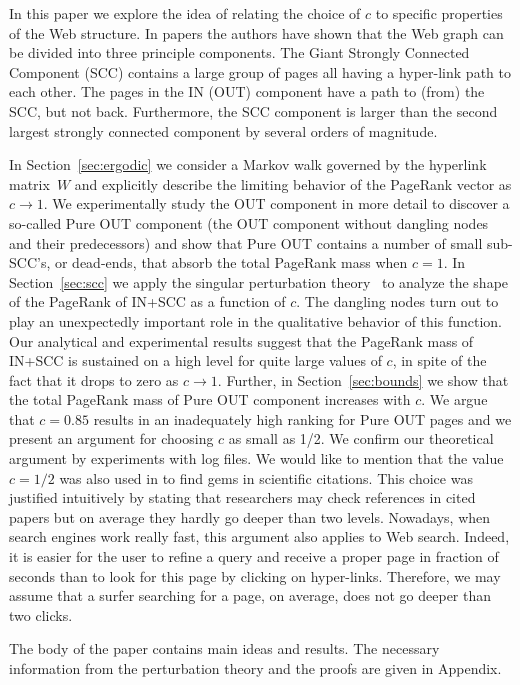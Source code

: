 \documentclass{article}
\begin{document}
In this paper we explore the idea of relating the choice of $c$ to
specific properties of the Web structure. In papers
\cite{Broder00,Kumar00} the authors have shown that the Web graph
can be divided into three principle components. The Giant Strongly
Connected Component (SCC) contains a large group of pages all having
a hyper-link path to each other. The pages in the IN (OUT) component
have a path to (from) the SCC, but not back. Furthermore, the SCC
component is larger than the second largest strongly connected
component by several orders of magnitude.

In
Section~\ref{sec:ergodic} we consider a Markov walk governed by the
hyperlink matrix~$W$ and explicitly describe the limiting behavior
of the PageRank vector as $c\to 1$. We experimentally study the
OUT component in more detail to discover a so-called Pure OUT
component (the OUT component without dangling nodes and their
predecessors) and show that Pure OUT contains a number of small
sub-SCC's, or dead-ends, that absorb the total PageRank mass when
$c=1$. In Section~\ref{sec:scc} we apply the singular perturbation
theory~\cite{Avrachenkov99thesis,KorolyukTurbin,PervozvanskiiGaitsgori,YinZhang}
to analyze the shape of the PageRank of IN+SCC as a function of
$c$. The dangling nodes turn out to play an unexpectedly important
role in the qualitative behavior of this function. Our analytical
and experimental results suggest that the PageRank mass of IN+SCC
is sustained on a high level for quite large values of
$c$, in spite of the fact that it drops to zero as $c\to 1$.
 Further, in Section~\ref{sec:bounds} we show that the total
PageRank mass of Pure OUT component increases with $c$. We argue
that $c=0.85$ results in an inadequately high ranking for Pure OUT
pages and we present an argument for choosing $c$ as small as 1/2.
We confirm our theoretical argument by experiments with log files.
We would like to mention that the value $c=1/2$ was also used in
\cite{PRcitations} to find gems in scientific citations. This choice
was justified intuitively by stating that researchers may check
references in cited papers but on average they hardly go deeper than
two levels. Nowadays, when search engines work really fast, this
argument also applies to Web search. Indeed, it is easier for the
user to refine a query and receive a proper page in fraction of
seconds than to look for this page by clicking on hyper-links.
Therefore, we may assume that a surfer searching for a page, on
average, does not go deeper than two clicks.

The body of the paper contains main ideas and results. The
necessary information from the perturbation theory and the proofs
are given in Appendix.
\end{document}
